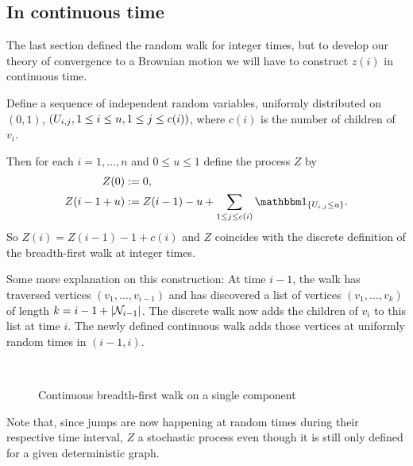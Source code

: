 \subsection{In continuous time}

The last section defined the random walk for integer times,
but to develop our theory of convergence to a Brownian motion
we will have to construct $z(i)$ in continuous time.

Define a sequence of independent random variables, 
uniformly distributed on $(0,1)$, 
$(U_{i,j}, 1 \leq i \leq n, 1 \leq j \leq c(i))$,
where $c(i)$ is the number of children of $v_i$.

Then for each $i = 1, \dots, n$ and $0 \leq u \leq 1$ define the process $Z$ by
\begin{equation} \label{E: def Z}
\begin{aligned}
Z(0) &:= 0, \\
Z(i - 1 + u) &:= Z(i-1) - u + \sum_{1 \leq j \leq c(i)} \Ind{\{ \Uij \leq u \}}.
\end{aligned}
\end{equation}
So $Z(i) = Z(i-1) - 1 + c(i)$ and $Z$ coincides with the discrete definition of the breadth-first walk at integer times.

Some more explanation on this construction:
At time $i-1$, 
the walk has traversed vertices
$(v_1, \dots, v_{i-1})$
and has discovered a list of vertices
$(v_1, \dots, v_k)$
of length
$k = i-1 + |\mathcal{N}_{i-1}|$.
The discrete walk now adds the children of $v_i$ to this list at time $i$.
The newly defined continuous walk adds those vertices at uniformly random times in $(i-1, i)$.

\begin{figure}[H]
	\centering
	\\
	
	\centering
	
	\caption{Continuous breadth-first walk on a single component}
	\label{F: bf-walk cont}
\end{figure} 

Note that, 
since jumps are now happening at random times during their respective time interval, 
$Z$ a stochastic process even though it is still only defined for a given deterministic graph.



